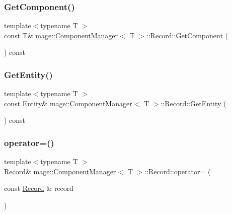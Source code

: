 \subsubsection{\texorpdfstring{Get\+Component()}{GetComponent()}\hspace{0.1cm}{\footnotesize\ttfamily [2/2]}}
{\footnotesize\ttfamily template$<$typename T $>$ \\
const T\& \mbox{\hyperlink{classmage_1_1_component_manager}{mage\+::\+Component\+Manager}}$<$ T $>$\+::Record\+::\+Get\+Component (\begin{DoxyParamCaption}{ }\end{DoxyParamCaption}) const\hspace{0.3cm}{\ttfamily [noexcept]}}

\mbox{\label{classmage_1_1_component_manager_1_1_record_a22ec458d4dfde15cf1066fd12a16608e}} 
\subsubsection{\texorpdfstring{Get\+Entity()}{GetEntity()}}
{\footnotesize\ttfamily template$<$typename T $>$ \\
const \mbox{\hyperlink{classmage_1_1_entity}{Entity}}\& \mbox{\hyperlink{classmage_1_1_component_manager}{mage\+::\+Component\+Manager}}$<$ T $>$\+::Record\+::\+Get\+Entity (\begin{DoxyParamCaption}{ }\end{DoxyParamCaption}) const\hspace{0.3cm}{\ttfamily [noexcept]}}

\mbox{\label{classmage_1_1_component_manager_1_1_record_aff9e4c6ba2e99c72dc07be6fadfa96a3}} 
\subsubsection{\texorpdfstring{operator=()}{operator=()}\hspace{0.1cm}{\footnotesize\ttfamily [1/2]}}
{\footnotesize\ttfamily template$<$typename T $>$ \\
\mbox{\hyperlink{classmage_1_1_component_manager_1_1_record}{Record}}\& \mbox{\hyperlink{classmage_1_1_component_manager}{mage\+::\+Component\+Manager}}$<$ T $>$\+::Record\+::operator= (\begin{DoxyParamCaption}\item[{const \mbox{\hyperlink{classmage_1_1_component_manager_1_1_record}{Record}} \&}]{record }\end{DoxyParamCaption})\hspace{0.3cm}{\ttfamily [delete]}}

